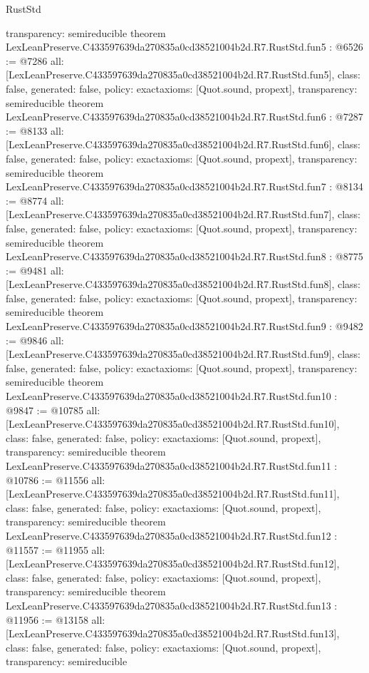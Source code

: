\begin{lexlean}{RustStd}
\begin{coremodule}
{  transparency: semireducible
}
theorem LexLeanPreserve.C433597639da270835a0cd38521004b2d.R7.RustStd.fun5 : @6526 := @7286 {
  all: [LexLeanPreserve.C433597639da270835a0cd38521004b2d.R7.RustStd.fun5],
  class: false,
  generated: false,
  policy: exact{axioms: [Quot.sound, propext]},
  transparency: semireducible
}
theorem LexLeanPreserve.C433597639da270835a0cd38521004b2d.R7.RustStd.fun6 : @7287 := @8133 {
  all: [LexLeanPreserve.C433597639da270835a0cd38521004b2d.R7.RustStd.fun6],
  class: false,
  generated: false,
  policy: exact{axioms: [Quot.sound, propext]},
  transparency: semireducible
}
theorem LexLeanPreserve.C433597639da270835a0cd38521004b2d.R7.RustStd.fun7 : @8134 := @8774 {
  all: [LexLeanPreserve.C433597639da270835a0cd38521004b2d.R7.RustStd.fun7],
  class: false,
  generated: false,
  policy: exact{axioms: [Quot.sound, propext]},
  transparency: semireducible
}
theorem LexLeanPreserve.C433597639da270835a0cd38521004b2d.R7.RustStd.fun8 : @8775 := @9481 {
  all: [LexLeanPreserve.C433597639da270835a0cd38521004b2d.R7.RustStd.fun8],
  class: false,
  generated: false,
  policy: exact{axioms: [Quot.sound, propext]},
  transparency: semireducible
}
theorem LexLeanPreserve.C433597639da270835a0cd38521004b2d.R7.RustStd.fun9 : @9482 := @9846 {
  all: [LexLeanPreserve.C433597639da270835a0cd38521004b2d.R7.RustStd.fun9],
  class: false,
  generated: false,
  policy: exact{axioms: [Quot.sound, propext]},
  transparency: semireducible
}
theorem LexLeanPreserve.C433597639da270835a0cd38521004b2d.R7.RustStd.fun10 : @9847 := @10785 {
  all: [LexLeanPreserve.C433597639da270835a0cd38521004b2d.R7.RustStd.fun10],
  class: false,
  generated: false,
  policy: exact{axioms: [Quot.sound, propext]},
  transparency: semireducible
}
theorem LexLeanPreserve.C433597639da270835a0cd38521004b2d.R7.RustStd.fun11 : @10786 := @11556 {
  all: [LexLeanPreserve.C433597639da270835a0cd38521004b2d.R7.RustStd.fun11],
  class: false,
  generated: false,
  policy: exact{axioms: [Quot.sound, propext]},
  transparency: semireducible
}
theorem LexLeanPreserve.C433597639da270835a0cd38521004b2d.R7.RustStd.fun12 : @11557 := @11955 {
  all: [LexLeanPreserve.C433597639da270835a0cd38521004b2d.R7.RustStd.fun12],
  class: false,
  generated: false,
  policy: exact{axioms: [Quot.sound, propext]},
  transparency: semireducible
}
theorem LexLeanPreserve.C433597639da270835a0cd38521004b2d.R7.RustStd.fun13 : @11956 := @13158 {
  all: [LexLeanPreserve.C433597639da270835a0cd38521004b2d.R7.RustStd.fun13],
  class: false,
  generated: false,
  policy: exact{axioms: [Quot.sound, propext]},
  transparency: semireducible
}
\end{coremodule}
\end{lexlean}
